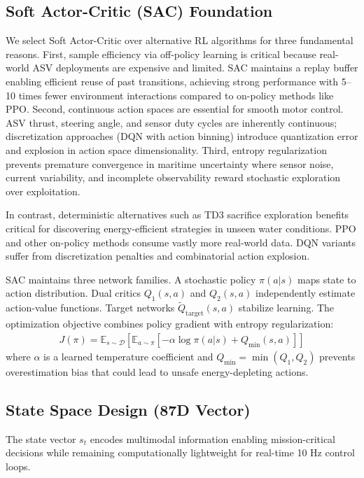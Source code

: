 \subsection{Soft Actor-Critic (SAC) Foundation}

We select Soft Actor-Critic over alternative RL algorithms for three fundamental reasons. First, sample efficiency via off-policy learning is critical because real-world ASV deployments are expensive and limited. SAC maintains a replay buffer enabling efficient reuse of past transitions, achieving strong performance with 5--10 times fewer environment interactions compared to on-policy methods like PPO. Second, continuous action spaces are essential for smooth motor control. ASV thrust, steering angle, and sensor duty cycles are inherently continuous; discretization approaches (DQN with action binning) introduce quantization error and explosion in action space dimensionality. Third, entropy regularization prevents premature convergence in maritime uncertainty where sensor noise, current variability, and incomplete observability reward stochastic exploration over exploitation.

In contrast, deterministic alternatives such as TD3 sacrifice exploration benefits critical for discovering energy-efficient strategies in unseen water conditions. PPO and other on-policy methods consume vastly more real-world data. DQN variants suffer from discretization penalties and combinatorial action explosion.

SAC maintains three network families. A stochastic policy $\pi(a|s)$ maps state to action distribution. Dual critics $Q_1(s,a)$ and $Q_2(s,a)$ independently estimate action-value functions. Target networks $\tilde{Q}_{\text{target}}(s,a)$ stabilize learning. The optimization objective combines policy gradient with entropy regularization:
\begin{align}
J(\pi) = \mathbb{E}_{s \sim \mathcal{D}}[\mathbb{E}_{a \sim \pi}[-\alpha \log \pi(a|s) + Q_{\min}(s,a)]]
\end{align}
where $\alpha$ is a learned temperature coefficient and $Q_{\min} = \min(Q_1, Q_2)$ prevents overestimation bias that could lead to unsafe energy-depleting actions.

\subsection{State Space Design (87D Vector)}

The state vector $s_t$ encodes multimodal information enabling mission-critical decisions while remaining computationally lightweight for real-time 10 Hz control loops.

